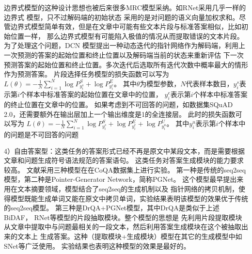 \noindent 边界式模型的这种设计思想也被后来很多MRC模型采纳。如RNet采用几乎一样的边界式
模型，只不过解码端的初始状态
采用的是对问题的语义向量加权求和。尽管边界式模型简单有效，但是在文章中可能有些文本片段与标准答案相似，比如初始位置一样，
那么边界式模型有可能陷入极值的情况从而提取错误的文本片段。为了处理这个问题，DCN
模型提出一种动态迭代的指针网络作为解码端，利用上一次预测的答案的起始位置和终止位置以及解码端当前的状态来重新评估
下一次预测答案的起始位置和终止位置。多次迭代后选取所有迭代次数中概率最大的情形作为预测答案。
片段选择任务模型的损失函数可以写为
$L(\theta)=-\displaystyle\frac{1}{N}\sum_{i=1}^{N}\log P_{y_i^s}^S+\log P_{y_i^e}^E$。
其中$\theta$为模型参数，$N$代表样本数目，$y_i^s$表示第$i$个样本中标准答案的起始位置在文章中的位置，
$y_i^e$表示第$i$个样本中标准答案的终止位置在文章中的位置。
如果考虑到不可回答的问题，如数据集SQuAD 2.0，还需要额外在输出层加上一个输出维度是1的全连接层。
此时的损失函数可以写为
$L(\theta)=-\displaystyle\frac{1}{N}\sum_{i=1}^{N}\log P_{y_i^s}^S+\log P_{y_i^e}^E+\log P_{y_i^u}^U$。
其中$y_i^u$表示第$i$个样本中的问题是不可回答的问题

4）自由答案型：这类任务的答案形式已经不再是原文中某段文本，而是需要根据文章和问题生成符号语法规范的答案语句。
这类任务对答案生成模块的能力要求较高。
文献\cite{CoQA}采用三种模型在在CoQA数据集上进行实验。
第一种是传统的seq2seq模型，第二种是Pointer-Generator Network\cite{PGNet}，简称PGNet。
这个模型最早提出来用在文本摘要领域，模型结合了seq2seq的生成机制以及
指针网络的拷贝机制，使得模型既能生成单词又能在原文中拷贝单词，实验结果表明该模型的效果优于传统的seq2seq模型。
第三种是DrQA+PGNet模型，其中DrQA\cite{DrQA}是类似于上述
BiDAF，
RNet等模型的片段抽取模块。整个模型的思想是
先利用片段提取模块从文章中提取中与问题最相关的一段文本，然后利用答案生成模块在这个被抽取出来的文本上
生成答案。这种（提取模块+生成模块）模型在其它的生成模型中如SNet等广泛使用。
实验结果也表明这种模型的效果是最好的。






